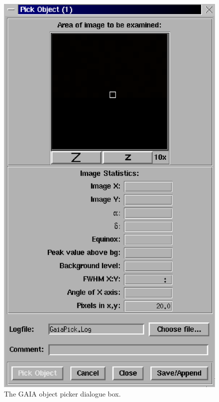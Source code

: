 \documentclass[twoside,11pt]{article}
\newenvironment{latexonly}{}{}
\renewcommand{\_}{\texttt{\symbol{95}}}
\begin{document}
\begin{enumerate}
\begin{latexonly}
  \vspace{2mm}
  \begin{figure}[htb]
  \begin{center}
  \includegraphics[clip,scale=0.5]{sun223_figures/gaia3.eps}
  \caption{The GAIA object picker dialogue box.}
  \label{fig:gaia3}
  \end{center}
  \end{figure}
\end{latexonly}


\end{enumerate}
\end{document}
